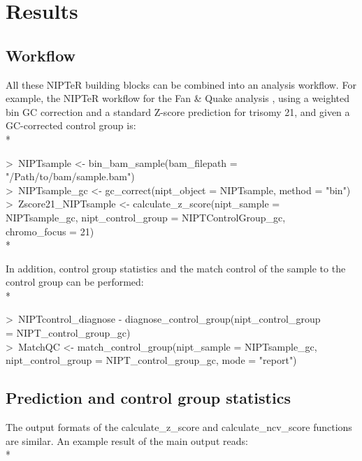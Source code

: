 \newpage

\section{Results}\label{Results}
\subsection{Workflow}
All these NIPTeR building blocks can be combined into an analysis workflow. For example, the NIPTeR workflow for the Fan \& Quake analysis \cite{Fan_2010}, using a weighted bin GC correction and a standard Z-score prediction for trisomy 21, and given a GC-corrected control group is: \\*

\selectfont %
\footnotesize
\noindent\textgreater\ NIPTsample \textless- bin\_bam\_sample(bam\_filepath = \\\indent "/Path/to/bam/sample.bam") \\
\textgreater\ NIPTsample\_gc \textless- gc\_correct(nipt\_object = NIPTsample, method = "bin") \\
\textgreater\ Zscore21\_NIPTsample \textless-  calculate\_z\_score(nipt\_sample = \\\indent NIPTsample\_gc, nipt\_control\_group = NIPTControlGroup\_gc, \\\indent chromo\_focus = 21) \\*
\selectfont %

In addition, control group statistics and the match control of the sample to the control group can be performed: \\*

\selectfont %
\footnotesize %
\noindent\textgreater\ NIPTcontrol\_diagnose - diagnose\_control\_group(nipt\_control\_group \\\indent= NIPT\_control\_group\_gc) \\
\textgreater\ MatchQC \textless- match\_control\_group(nipt\_sample = NIPTsample\_gc, \\\indent nipt\_control\_group = NIPT\_control\_group\_gc, mode = "report")
\selectfont %
\normalsize %

\subsection{Prediction and control group statistics}
The output formats of the calculate\_z\_score and calculate\_ncv\_score functions are similar. An example result of the main output reads: \\*

